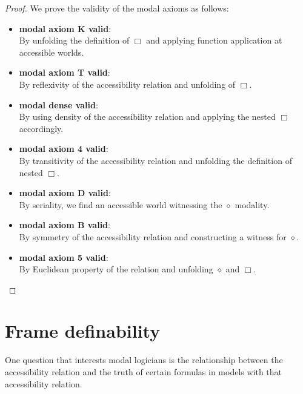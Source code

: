 \begin{proof}\label{proof:truth-guarantee}
 \leanok
  We prove the validity of the modal axioms as follows:
  \begin{itemize}
    \item \textbf{modal axiom K valid}:  \leanok\\
    By unfolding the definition of \(\Box\) and applying function application at accessible worlds.

    \item \textbf{modal axiom T valid}: \\
    By reflexivity of the accessibility relation and unfolding of \(\Box\).

    \item \textbf{modal dense valid}: \leanok \\
    By using density of the accessibility relation and applying the nested \(\Box\) accordingly.

    \item \textbf{modal axiom 4 valid}: \leanok \\
    By transitivity of the accessibility relation and unfolding the definition of nested \(\Box\).

    \item \textbf{modal axiom D valid}:  \leanok\\
    By seriality, we find an accessible world witnessing the \(\diamond\) modality.

    \item \textbf{modal axiom B valid}:  \leanok\\
    By symmetry of the accessibility relation and constructing a witness for \(\diamond\).

    \item \textbf{modal axiom 5 valid}: \leanok \\
    By Euclidean property of the relation and unfolding \(\diamond\) and \(\Box\).
  \end{itemize}
\end{proof}

\section{Frame definability}

One question that interests modal logicians is the relationship between 
the accessibility relation and the truth of certain formulas in models 
with that accessibility relation.

